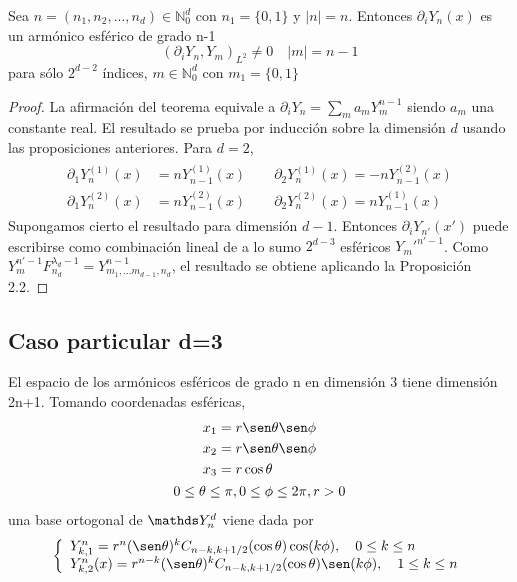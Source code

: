 \begin{thm}
	Sea $n=(n_1,n_2,...,n_d)\in\mathds{N}_0^d$ con $n_1=\{0,1\}$ y $|n|=n$. Entonces
	$\partial_i Y_n(x)$ es un armónico esférico de grado n-1 $$
	(\partial_i Y_n,Y_m)_{L^2} \neq 0 \quad |m|=n-1$$
	para sólo $2^{d-2}$ índices, $m\in\mathds{N}_0^d$ con $m_1=\{0,1\}$
\end{thm}
\begin{proof}
La afirmación del teorema equivale a $\partial_i Y_n = \sum_{m} a_mY_m^{n-1}$ siendo $a_m$ una constante real. El resultado se prueba por inducción sobre la dimensión $d$ usando las proposiciones anteriores.
Para $d=2$, 
\begin{gather*}
\begin{aligned}
\partial_1 Y_n^{(1)}(x) &= nY_{n-1}^{(1)}(x) \qquad \partial_2 Y_n^{(1)}(x) = -nY_{n-1}^{(2)}(x)
\\ \partial_1 Y_n^{(2)}(x) &= nY_{n-1}^{(2)}(x) \qquad \partial_2 Y_n^{(2)}(x) = nY_{n-1}^{(1)}(x)
\end{aligned}
\end{gather*}
Supongamos cierto el resultado para dimensión $d-1$. Entonces $\partial_i Y_{n'}(x')$ puede escribirse como combinación lineal de a lo sumo $2^{d-3}$ esféricos $Y_m'^{n'-1}$. Como $Y_m^{n'-1}F_{n_d}^{\lambda_d-1} = Y_{m_1,...m_{d-1},n_d}^{n-1}$, el resultado se obtiene aplicando la Proposición 2.2.
\end{proof}
\subsection{Caso particular d=3}
El espacio de los armónicos esféricos de grado n en dimensión 3 tiene dimensión 2n+1. Tomando coordenadas esféricas,
\begin{gather*}
\begin{aligned}
x_1 &= r \sen \theta \sen \phi\\
x_2 &= r \sen \theta \sen \phi\\
x_3 &= r \cos \theta\\
\end{aligned}
\\
0\le \theta \le \pi,0\le\phi\le2\pi,r>0
\end{gather*}
una base ortogonal de $\spharm$ viene dada por
\begin{equation}
	\left\lbrace
	\begin{array}{ll}
	Y^n_ {k,1} = r^n(\sen \theta)^kC_{n-k,k+1/2}(\cos \theta) \cos(k\phi),\quad 0\le k\le n \\
	Y^n_{k,2}(x) = r^{n-k}(\sen\theta)^kC_{n-k,k+1/2}(\cos\theta)\sen(k\phi), \quad 1\le k\le n
	\end{array}
	\right.
\end{equation}

